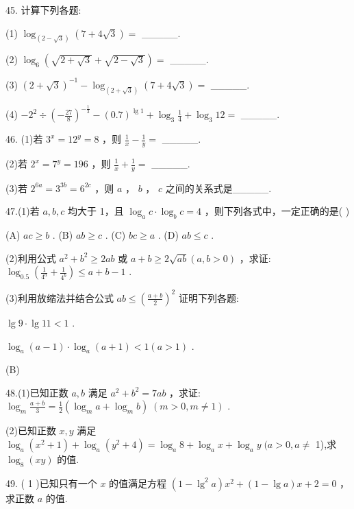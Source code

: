 \documentclass[10pt]{article}
\newcommand*\circled[1]{\tikz[baseline=(char.base)]{\node[shape=circle,draw,inner sep=1.5pt] (char) {\small #1};}}
\begin{document}
45. 计算下列各题:

(1) \({\log }_{\left( 2 - \sqrt{3}\right) }\left( {7 + 4\sqrt{3}}\right)  =\) \_\_\_\_\_.

(2) \({\log }_{6}\left( {\sqrt{2 + \sqrt{3}} + \sqrt{2 - \sqrt{3}}}\right)  =\) \_\_\_\_\_.

(3) \({\left( 2 + \sqrt{3}\right) }^{-1} - {\log }_{\left( 2 + \sqrt{3}\right) }\left( {7 + 4\sqrt{3}}\right)  =\) \_\_\_\_\_.

(4) \(- {2}^{2} \div  {\left( -\frac{27}{8}\right) }^{-\frac{1}{3}} - {\left( {0.7}\right) }^{\lg 1} + {\log }_{3}\frac{1}{4} + {\log }_{3}{12} =\) \_\_\_\_\_.

46. (1)若 \({3}^{x} = {12}^{y} = 8\) ，则 \(\frac{1}{x} - \frac{1}{y} =\) \_\_\_\_\_.

(2)若 \({2}^{x} = {7}^{y} = {196}\) ，则 \(\frac{1}{x} + \frac{1}{y} =\) \_\_\_\_\_.

(3)若 \({2}^{6a} = {3}^{3b} = {6}^{2c}\) ，则 \(a\) ， \(b\) ， \(c\) 之间的关系式是\_\_\_\_\_.

47.(1)若 \(a,b,c\) 均大于 1，且 \({\log }_{a}c \cdot  {\log }_{b}c = 4\) ，则下列各式中，一定正确的是( )

(A) \({ac} \geq  b\) . (B) \({ab} \geq  c\) . (C) \({bc} \geq  a\) . (D) \({ab} \leq  c\) .

(2)利用公式 \({a}^{2} + {b}^{2} \geq  {2ab}\) 或 \(a + b \geq  {2\sqrt{ab}}\left( {a,b > 0}\right)\) ，求证: \({\log }_{0.5}\left( {\frac{1}{{4}^{a}} + \frac{1}{{4}^{b}}}\right)  \leq  a + b - 1\) .

(3)利用放缩法并结合公式 \({ab} \leq  {\left( \frac{a + b}{2}\right) }^{2}\) 证明下列各题:

 \circled{1}  \(\lg 9 \cdot  \lg {11} < 1\) .

 \circled{2}  \({\log }_{a}\left( {a - 1}\right)  \cdot  {\log }_{a}\left( {a + 1}\right)  < 1\left( {a > 1}\right)\) .

(B)

48.(1)已知正数 \(a,b\) 满足 \({a}^{2} + {b}^{2} = {7ab}\) ，求证: \({\log }_{m}\frac{a + b}{3} = \frac{1}{2}\left( {{\log }_{m}a + {\log }_{m}b}\right) \;\left( {m > 0,m \neq  1}\right)\) .

(2)已知正数 \(x,y\) 满足 \({\log }_{a}\left( {{x}^{2} + 1}\right)  + {\log }_{a}\left( {{y}^{2} + 4}\right)  = {\log }_{a}8 + {\log }_{a}x + {\log }_{a}y\;(a > 0,a \neq\) 1),求 \({\log }_{8}\left( {xy}\right)\) 的值.

49. ( 1 )已知只有一个 \(x\) 的值满足方程 \(\left( {1 - {\lg }^{2}a}\right) {x}^{2} + \left( {1 - \lg a}\right) x + 2 = 0\) ，求正数 \(a\) 的值.
\end{document}
